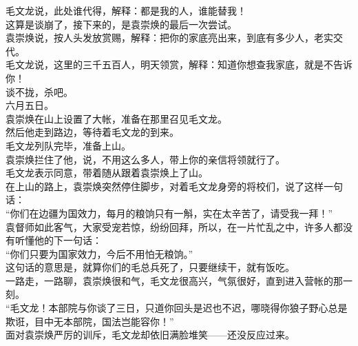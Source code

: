 \begin{multicols}{\theparacolNo}
毛文龙说，此处谁代得，解释：都是我的人，谁能替我！\\

这算是谈崩了，接下来的，是袁崇焕的最后一次尝试。\\

袁崇焕说，按人头发放赏赐，解释：把你的家底亮出来，到底有多少人，老实交代。\\

毛文龙说，这里的三千五百人，明天领赏，解释：知道你想查我家底，就是不告诉你！\\

谈不拢，杀吧。\\

六月五日。\\

袁崇焕在山上设置了大帐，准备在那里召见毛文龙。\\

然后他走到路边，等待着毛文龙的到来。\\

毛文龙列队完毕，准备上山。\\

袁崇焕拦住了他，说，不用这么多人，带上你的亲信将领就行了。\\

毛文龙表示同意，带着随从跟着袁崇焕上了山。\\

在上山的路上，袁崇焕突然停住脚步，对着毛文龙身旁的将校们，说了这样一句话：\\

“你们在边疆为国效力，每月的粮饷只有一斛，实在太辛苦了，请受我一拜！”\\

袁督师如此客气，大家受宠若惊，纷纷回拜，所以，在一片忙乱之中，许多人都没有听懂他的下一句话：\\

“你们只要为国家效力，今后不用怕无粮饷。”\\

这句话的意思是，就算你们的毛总兵死了，只要继续干，就有饭吃。\\

一路走，一路聊，袁崇焕很和气，毛文龙很高兴，气氛很好，直到进入营帐的那一刻。\\

“毛文龙！本部院与你谈了三日，只道你回头是迟也不迟，哪晓得你狼子野心总是欺诳，目中无本部院，国法岂能容你！”\\

面对袁崇焕严厉的训斥，毛文龙却依旧满脸堆笑——还没反应过来。\\


\end{multicols}
